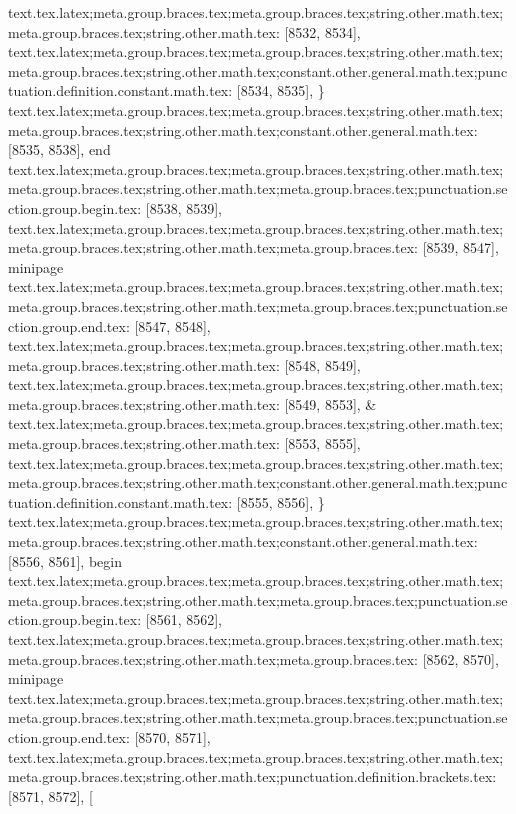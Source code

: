 {{{{{{{{{{{{{{{{{{{{{{{{{{{{{{{{{{{{{{{{{{{{{{{{{{{{{{{{{{{{{{{{{{{{{{{{{{{{{{{{{{{{{{{{{{{{{{{{{{{{{{{{{{{{{{{{{{{{{{{{{{{{{{{{{{{{{{{{{{{{{{{{{{{{{{{{{{{{{{{{{{{{{{{{{{{{{{{{{{{{{{{{{{{{{{{{{{{{{{{{{{{{{{{{{{{{{{{{{{{{{{{{{{{{{{{{{{{{{{{{{{{{{{{{{{{{}
text.tex.latex;meta.group.braces.tex;meta.group.braces.tex;string.other.math.tex;meta.group.braces.tex;string.other.math.tex: [8532, 8534], {  }
text.tex.latex;meta.group.braces.tex;meta.group.braces.tex;string.other.math.tex;meta.group.braces.tex;string.other.math.tex;constant.other.general.math.tex;punctuation.definition.constant.math.tex: [8534, 8535], {\}
text.tex.latex;meta.group.braces.tex;meta.group.braces.tex;string.other.math.tex;meta.group.braces.tex;string.other.math.tex;constant.other.general.math.tex: [8535, 8538], {end}
text.tex.latex;meta.group.braces.tex;meta.group.braces.tex;string.other.math.tex;meta.group.braces.tex;string.other.math.tex;meta.group.braces.tex;punctuation.section.group.begin.tex: [8538, 8539], {{}
text.tex.latex;meta.group.braces.tex;meta.group.braces.tex;string.other.math.tex;meta.group.braces.tex;string.other.math.tex;meta.group.braces.tex: [8539, 8547], {minipage}
text.tex.latex;meta.group.braces.tex;meta.group.braces.tex;string.other.math.tex;meta.group.braces.tex;string.other.math.tex;meta.group.braces.tex;punctuation.section.group.end.tex: [8547, 8548], {}}
text.tex.latex;meta.group.braces.tex;meta.group.braces.tex;string.other.math.tex;meta.group.braces.tex;string.other.math.tex: [8548, 8549], {
}
text.tex.latex;meta.group.braces.tex;meta.group.braces.tex;string.other.math.tex;meta.group.braces.tex;string.other.math.tex: [8549, 8553], {  &
}
text.tex.latex;meta.group.braces.tex;meta.group.braces.tex;string.other.math.tex;meta.group.braces.tex;string.other.math.tex: [8553, 8555], {  }
text.tex.latex;meta.group.braces.tex;meta.group.braces.tex;string.other.math.tex;meta.group.braces.tex;string.other.math.tex;constant.other.general.math.tex;punctuation.definition.constant.math.tex: [8555, 8556], {\}
text.tex.latex;meta.group.braces.tex;meta.group.braces.tex;string.other.math.tex;meta.group.braces.tex;string.other.math.tex;constant.other.general.math.tex: [8556, 8561], {begin}
text.tex.latex;meta.group.braces.tex;meta.group.braces.tex;string.other.math.tex;meta.group.braces.tex;string.other.math.tex;meta.group.braces.tex;punctuation.section.group.begin.tex: [8561, 8562], {{}
text.tex.latex;meta.group.braces.tex;meta.group.braces.tex;string.other.math.tex;meta.group.braces.tex;string.other.math.tex;meta.group.braces.tex: [8562, 8570], {minipage}
text.tex.latex;meta.group.braces.tex;meta.group.braces.tex;string.other.math.tex;meta.group.braces.tex;string.other.math.tex;meta.group.braces.tex;punctuation.section.group.end.tex: [8570, 8571], {}}
text.tex.latex;meta.group.braces.tex;meta.group.braces.tex;string.other.math.tex;meta.group.braces.tex;string.other.math.tex;punctuation.definition.brackets.tex: [8571, 8572], {[}
}}}}}}}}}}}}}}}}}}}}}}}}}}}}}}}}}}}}}}}}}}}}}}}}}}}}}}}}}}}}}}}}}}}}}}}}}}}}}}}}}}}}}}}}}}}}}}}}}}}}}}}}}}}}}}}}}}}}}}}}}}}}}}}}}}}}}}}}}}}}}}}}}}}}}}}}}}}}}}}}}}}}}}}}}}}}}}}}}}}}}}}}}}}}}}}}}}}}}}}}}}}}}}}}}}}}}}}}}}}}}}}}}}}}}}}}}}}}}}}}}}}}}}}}}}}}}
